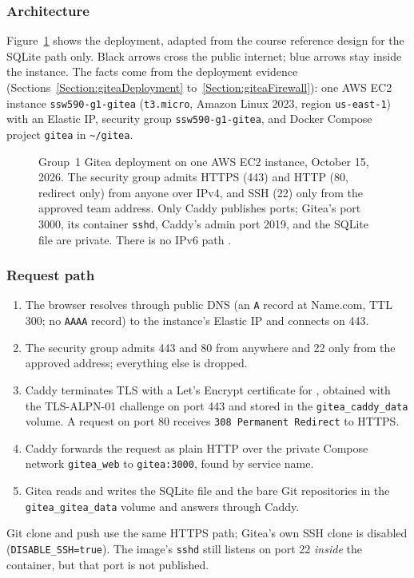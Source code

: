 \subsubsection{Architecture}
Figure~\ref{Figure:GiteaArchitecture} shows the deployment, adapted from the
course reference design \cite{DosManual} for the SQLite path only. Black
arrows cross the public internet; blue arrows stay inside the instance. The
facts come from the deployment evidence (Sections~\ref{Section:giteaDeployment}
to~\ref{Section:giteaFirewall}): one AWS EC2 instance
\texttt{ssw590-g1-gitea} (\texttt{t3.micro}, Amazon Linux 2023, region
\texttt{us-east-1}) with an Elastic IP, security group
\texttt{ssw590-g1-gitea}, and Docker Compose project \texttt{gitea} in
\texttt{\textasciitilde/gitea}.

\begin{figure}[htbp]
\centering
\resizebox{\linewidth}{!}{}
\caption{Group~1 Gitea deployment on one AWS EC2 instance, October 15, 2026.
The security group admits HTTPS (443) and HTTP (80, redirect only) from
anyone over IPv4, and SSH (22) only from the approved team address. Only
Caddy publishes ports; Gitea's port 3000, its container \texttt{sshd}, Caddy's
admin port 2019, and the SQLite file are private. There is no IPv6 path
\cite{DosManual,GiteaDocker,CaddyAutoHTTPS}.}
\label{Figure:GiteaArchitecture}
\end{figure}

\subsubsection{Request path}
\begin{enumerate}[nosep]
  \item The browser resolves \GiteaHost{} through public DNS (an \texttt{A}
  record at Name.com, TTL 300; no \texttt{AAAA} record) to the instance's
  Elastic IP and connects on 443.
  \item The security group admits 443 and 80 from anywhere and 22 only from
  the approved address; everything else is dropped.
  \item Caddy terminates TLS with a Let's Encrypt certificate for
  \GiteaHost{}, obtained with the TLS-ALPN-01 challenge on port 443 and
  stored in the \texttt{gitea\_caddy\_data} volume. A request on port 80
  receives \texttt{308 Permanent Redirect} to HTTPS.
  \item Caddy forwards the request as plain HTTP over the private Compose
  network \texttt{gitea\_web} to \texttt{gitea:3000}, found by service name.
  \item Gitea reads and writes the SQLite file and the bare Git repositories
  in the \texttt{gitea\_gitea\_data} volume and answers through Caddy.
\end{enumerate}
Git clone and push use the same HTTPS path; Gitea's own SSH clone is disabled
(\texttt{DISABLE\_SSH=true}). The image's \texttt{sshd} still listens on port
22 \emph{inside} the container, but that port is not published.

